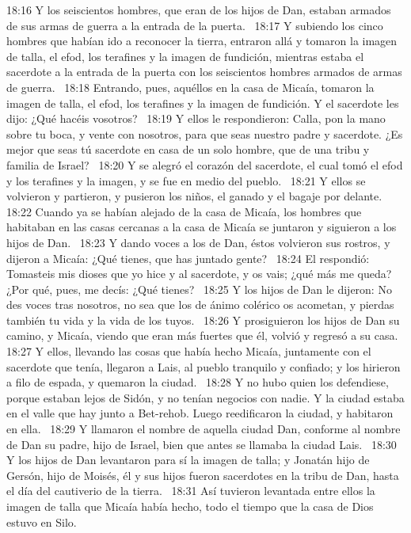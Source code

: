 18:16 Y los seiscientos hombres, que eran de los hijos de Dan, estaban armados de sus armas de guerra a la entrada de la puerta.  
18:17 Y subiendo los cinco hombres que habían ido a reconocer la tierra, entraron allá y tomaron la imagen de talla, el efod, los terafines y la imagen de fundición, mientras estaba el sacerdote a la entrada de la puerta con los seiscientos hombres armados de armas de guerra.  
18:18 Entrando, pues, aquéllos en la casa de Micaía, tomaron la imagen de talla, el efod, los terafines y la imagen de fundición. Y el sacerdote les dijo: ¿Qué hacéis vosotros?  
18:19 Y ellos le respondieron: Calla, pon la mano sobre tu boca, y vente con nosotros, para que seas nuestro padre y sacerdote. ¿Es mejor que seas tú sacerdote en casa de un solo hombre, que de una tribu y familia de Israel?  
18:20 Y se alegró el corazón del sacerdote, el cual tomó el efod y los terafines y la imagen, y se fue en medio del pueblo.  
18:21 Y ellos se volvieron y partieron, y pusieron los niños, el ganado y el bagaje por delante.  
18:22 Cuando ya se habían alejado de la casa de Micaía, los hombres que habitaban en las casas cercanas a la casa de Micaía se juntaron y siguieron a los hijos de Dan.  
18:23 Y dando voces a los de Dan, éstos volvieron sus rostros, y dijeron a Micaía: ¿Qué tienes, que has juntado gente?  
18:24 El respondió: Tomasteis mis dioses que yo hice y al sacerdote, y os vais; ¿qué más me queda? ¿Por qué, pues, me decís: ¿Qué tienes?  
18:25 Y los hijos de Dan le dijeron: No des voces tras nosotros, no sea que los de ánimo colérico os acometan, y pierdas también tu vida y la vida de los tuyos.  
18:26 Y prosiguieron los hijos de Dan su camino, y Micaía, viendo que eran más fuertes que él, volvió y regresó a su casa.  
18:27 Y ellos, llevando las cosas que había hecho Micaía, juntamente con el sacerdote que tenía, llegaron a Lais, al pueblo tranquilo y confiado; y los hirieron a filo de espada, y quemaron la ciudad.  
18:28 Y no hubo quien los defendiese, porque estaban lejos de Sidón, y no tenían negocios con nadie. Y la ciudad estaba en el valle que hay junto a Bet-rehob. Luego reedificaron la ciudad, y habitaron en ella.  
18:29 Y llamaron el nombre de aquella ciudad Dan, conforme al nombre de Dan su padre, hijo de Israel, bien que antes se llamaba la ciudad Lais.  
18:30 Y los hijos de Dan levantaron para sí la imagen de talla; y Jonatán hijo de Gersón, hijo de Moisés, él y sus hijos fueron sacerdotes en la tribu de Dan, hasta el día del cautiverio de la tierra.  
18:31 Así tuvieron levantada entre ellos la imagen de talla que Micaía había hecho, todo el tiempo que la casa de Dios estuvo en Silo.  
